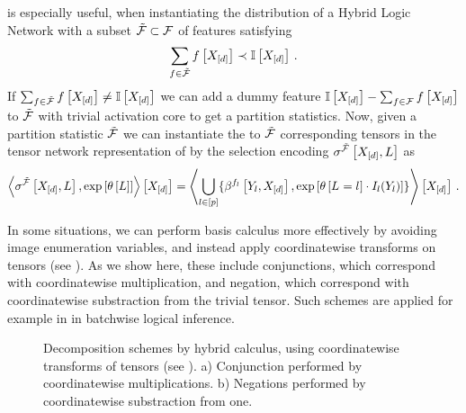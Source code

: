  is especially useful, when instantiating the distribution of a Hybrid Logic Network with a subset $\tilde{\mathcal{F}}\subset\mathcal{F}$ of features satisfying
\begin{align*}
    \sum_{f\in\tilde{\mathcal{F}}} f\left[X_{[d]}\right] \prec \mathbb{I}\left[X_{[d]}\right] \, .
\end{align*}
If $\sum_{f\in\tilde{\mathcal{F}}} f\left[X_{[d]}\right] \neq \mathbb{I}\left[X_{[d]}\right]$ we can add a dummy feature $\mathbb{I}\left[X_{[d]}\right]-\sum_{f\in\mathcal{F}} f\left[X_{[d]}\right]$ to $\tilde{\mathcal{F}}$ with trivial activation core to get a partition statistics.
Now, given a partition statistic $\tilde{\mathcal{F}}$ we can instantiate the to $\tilde{\mathcal{F}}$ corresponding tensors in the tensor network representation of  by the selection encoding $\sigma^{\tilde{\mathcal{F}}}\left[X_{[d]},L\right]$ as
\begin{align*}
    \left\langle \sigma^{\tilde{\mathcal{F}}}\left[X_{[d]},L\right],\mathrm{exp}\left[\theta\left[L\right]\right]\right\rangle \left[ X_{[d]} \right]
    = \left\langle \bigcup_{l\in[p]}\{\beta^{f_{l}}\left[Y_{l},X_{[d]}\right],\mathrm{exp}\left[\theta\left[L_{}=l_{}\right]\cdot I_{l}(Y_{l})\right]\}\right\rangle \left[ X_{[d]} \right] \, .
\end{align*}


\label{sec:hybridCalculus}

In some situations, we can perform basis calculus more effectively by avoiding image enumeration variables, and instead apply coordinatewise transforms on tensors (see ).
As we show here, these include conjunctions, which correspond with coordinatewise multiplication, and negation, which correspond with coordinatewise substraction from the trivial tensor.
Such schemes are applied for example in \cite{tsilionis_tensor-based_2024} in batchwise logical inference.

\begin{figure}
    \begin{center}
        
    \end{center}
    \caption{Decomposition schemes by hybrid calculus, using coordinatewise transforms of tensors (see ).
    a) Conjunction performed by coordinatewise multiplications.
    b) Negations performed by coordinatewise substraction from one.}\label{fig:ConNegDecomposition}
\end{figure}

